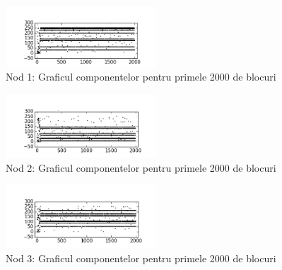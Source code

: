 \documentclass{llncs}
\begin{document}
\begin{figure}
\begin{center}
\includegraphics[width=0.5\textwidth]{img/carouri_db1.png}    %
\caption{Nod 1: Graficul componentelor pentru primele 2000 de blocuri} 
\label{fig:carouri_db1}
\end{center}
\end{figure}

\begin{figure}
\begin{center}
\includegraphics[width=0.5\textwidth]{img/carouri_db2.png}    %
\caption{Nod 2: Graficul componentelor pentru primele 2000 de blocuri} 
\label{fig:carouri_db2}
\end{center}
\end{figure}

\begin{figure}
\begin{center}
\includegraphics[width=0.5\textwidth]{img/carouri_db3.png}    %
\caption{Nod 3: Graficul componentelor pentru primele 2000 de blocuri} 
\label{fig:carouri_db3}
\end{center}
\end{figure}
\end{document}
